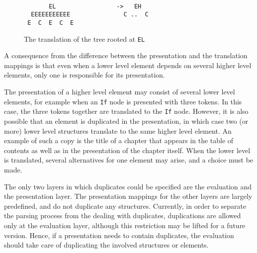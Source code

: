 \begin{figure}
\begin{center}
\begin{center}
\begin{verbatim}

       EL                 ->   EH
  EEEEEEEEEEE               C ..  C
 E  C  E  C  E

\end{verbatim}
\end{center}
\caption{The translation of the tree rooted at {\tt EL}}\label{elementTranslation} 
\end{center}
\end{figure}

%
%

A consequence from the difference between the presentation and the translation mappings is that even when a lower level element depends on several higher level elements, only one is responsible for its presentation.  




The presentation of a higher level element may consist of several lower level elements, for example when an \verb|If| node is presented with three tokens. In this case, the three tokens together are translated to the \verb|If| node. However, it is also possible that an element is duplicated in the presentation, in which case two (or more) lower level structures  translate to the same higher level element. An example of such a copy is the title of a chapter that appears in the table of contents as well as in the presentation of the chapter itself. When the lower level is translated, several alternatives for one element may arise, and a choice must be made. 

The only two layers in which duplicates could be specified are the evaluation and the presentation layer. The presentation mappings for the other layers are largely predefined, and do not duplicate any structures. Currently, in order to separate the parsing process from the dealing with duplicates, duplications are allowed only at the evaluation layer, although this restriction may be lifted for a future version. Hence, if a presentation needs to contain duplicates, the evaluation should take care of duplicating the involved structures or elements.

